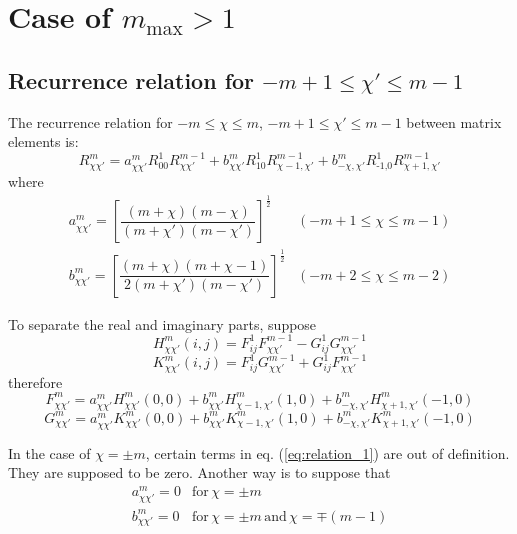 \section{Case of $m_{\mathrm{max}}>1$}

\subsection{Recurrence relation for $-m+1\leq\chi'\leq m-1$}

The recurrence relation for $-m\leq\chi\leq m$, $-m+1\leq\chi'\leq m-1$
between matrix elements is:
\begin{equation}
R_{\chi\chi'}^{m}=a_{\chi\chi'}^{m}R_{00}^{1}R_{\chi\chi'}^{m-1}+b_{\chi\chi'}^{m}R_{10}^{1}R_{\chi-1,\chi'}^{m-1}+b_{-\chi,\chi'}^{m}R_{\text{-1,}0}^{1}R_{\chi+1,\chi'}^{m-1}\label{eq:relation_1}
\end{equation}
where
\begin{equation}
\begin{array}{ll}
a_{\chi\chi'}^{m}=\left[\dfrac{\left(m+\chi\right)\left(m-\chi\right)}{\left(m+\chi'\right)\left(m-\chi'\right)}\right]^{\frac{1}{2}} & (-m+1\leq\chi\leq m-1)\\
b_{\chi\chi'}^{m}=\left[\dfrac{\left(m+\chi\right)\left(m+\chi-1\right)}{2\left(m+\chi'\right)\left(m-\chi'\right)}\right]^{\frac{1}{2}} & (-m+2\leq\chi\leq m-2)
\end{array}
\end{equation}

To separate the real and imaginary parts, suppose
\begin{equation}
H_{\chi\chi'}^{m}(i,j)=F_{ij}^{1}F_{\chi\chi'}^{m-1}-G_{ij}^{1}G_{\chi\chi'}^{m-1}
\end{equation}
\begin{equation}
K_{\chi\chi'}^{m}(i,j)=F_{ij}^{1}G_{\chi\chi'}^{m-1}+G_{ij}^{1}F_{\chi\chi'}^{m-1}
\end{equation}
therefore
\begin{equation}
F_{\chi\chi'}^{m}=a_{\chi\chi'}^{m}H_{\chi\chi'}^{m}(0,0)+b_{\chi\chi'}^{m}H_{\chi-1,\chi'}^{m}(1,0)+b_{-\chi,\chi'}^{m}H_{\chi+1,\chi'}^{m}(-1,0)
\end{equation}
\begin{equation}
G_{\chi\chi'}^{m}=a_{\chi\chi'}^{m}K_{\chi\chi'}^{m}(0,0)+b_{\chi\chi'}^{m}K_{\chi-1,\chi'}^{m}(1,0)+b_{-\chi,\chi'}^{m}K_{\chi+1,\chi'}^{m}(-1,0)
\end{equation}

In the case of $\chi=\pm m$, certain terms in eq. (\ref{eq:relation_1})
are out of definition. They are supposed to be zero. Another way is
to suppose that
\begin{equation}
\begin{array}{ll}
a_{\chi\chi'}^{m}=0 & \mathrm{for}\,\chi=\pm m\\
b_{\chi\chi'}^{m}=0 & \mathrm{for}\,\chi=\pm m\,\mathrm{and}\,\chi=\mp(m-1)
\end{array}
\end{equation}


